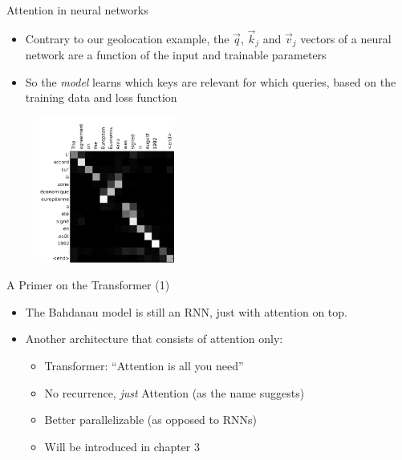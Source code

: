 
\begin{vbframe}{Attention in neural networks}

\vskip-2mm
\vfill

\begin{itemize}
\item Contrary to our geolocation example, the $\vec q$, $\vec k_j$ and $\vec v_j$ vectors of a neural network are a function of the input and trainable parameters
\item So the \textit{model} learns which keys are relevant for which queries, based on the training data and loss function
\end{itemize}

\begin{figure}
	\centering
		\includegraphics[width = 4.5cm]{figure/bahdanau4.png}\\ 
\end{figure}

\vfill

\end{vbframe}


\begin{vbframe}{A Primer on the Transformer (1)}

\vfill

\begin{itemize}
	\item The Bahdanau model is still an RNN, just with attention on top.
	\item Another architecture that consists of attention only: 
		\begin{itemize}
			\item Transformer: ``Attention is all you need'' 
			\item No recurrence, \textit{just} Attention (as the name suggests)
			\item Better parallelizable (as opposed to RNNs)
			\item Will be introduced in chapter 3
		\end{itemize}
\end{itemize}

\vfill

\end{vbframe}

